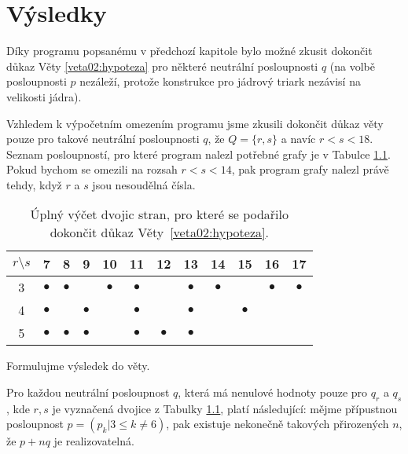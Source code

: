 \chapter{Výsledky} \label{vysledky}

Díky programu popsanému v předchozí kapitole bylo možné zkusit dokončit důkaz Věty \ref{veta02:hypoteza} pro některé neutrální posloupnosti $q$ (na volbě posloupnosti $p$ nezáleží, protože konstrukce pro jádrový triark nezávisí na velikosti jádra). 

Vzhledem k výpočetním omezením programu jsme zkusili dokončit důkaz věty pouze pro takové neutrální posloupnosti $q$, že $Q = \lbrace r, s\rbrace$ a navíc $r<s<18$. Seznam posloupností, pro které program nalezl potřebné grafy je v Tabulce \ref{obr03:tabvysledky}. Pokud bychom se omezili na rozsah $r<s<14$, pak program grafy nalezl právě tehdy, když $r$ a $s$ jsou nesoudělná čísla.

\begin{table}[h]\centering
\begin{tabular}{ c | c c c c c c c c c c c }
  {$r\setminus s$} & 7 & 8 & 9 & 10 & 11 & 12 & 13 & 14 & 15 & 16 & 17 \\ \hline
  3 & $\bullet$ & $\bullet$ &  & $\bullet$ & $\bullet$ &  & $\bullet$ & $\bullet$ &  & $\bullet$ & $\bullet$ \\
  4 & $\bullet$ &  & $\bullet$ &  & $\bullet$ &  & $\bullet$ &  & $\bullet$ \\
  5 & $\bullet$ & $\bullet$ & $\bullet$ &  & $\bullet$ & $\bullet$ & $\bullet$  
\end{tabular}
\caption{Úplný výčet dvojic stran, pro které se podařilo dokončit důkaz Věty~\ref{veta02:hypoteza}.}
\label{obr03:tabvysledky}
\end{table}

Formulujme výsledek do věty.

\begin{veta} \label{veta:vysledek}
Pro každou neutrální posloupnost $q$, která má nenulové hodnoty pouze pro $q_r$ a $q_s$, kde $r,s$ je vyznačená dvojice z Tabulky \ref{obr03:tabvysledky}, platí následující: 
mějme přípustnou posloupnost $p=(p_k | 3 \leq k \neq 6)$, pak existuje nekonečně takových přirozených $n$, že $p+nq$ je realizovatelná.
\end{veta}


